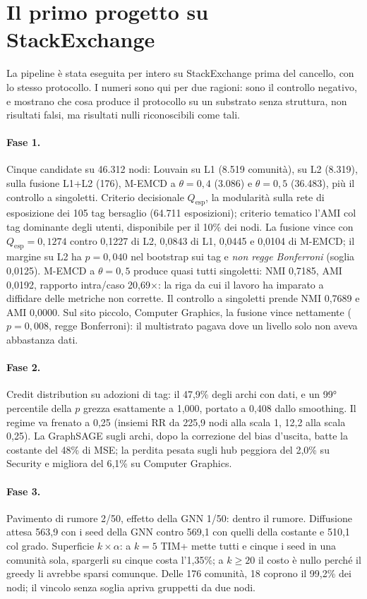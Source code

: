 \documentclass[11pt,a4paper]{article}
\newcommand{\Qesp}{Q_{\mathrm{esp}}}
\newcommand{\sx}{StackExchange}
\begin{document}
\clearpage
\section{Il primo progetto su StackExchange}
\label{app:stackexchange}
La pipeline è stata eseguita per intero su \sx{} prima del cancello, con lo stesso protocollo. I numeri sono qui per due ragioni: sono il controllo negativo, e mostrano che cosa produce il protocollo su un substrato senza struttura, non risultati falsi, ma risultati nulli riconoscibili come tali.

\paragraph{Fase 1.} Cinque candidate su 46.312 nodi: Louvain su L1 (8.519 comunità), su L2 (8.319), sulla fusione L1+L2 (176), M-EMCD a $\theta = 0{,}4$ (3.086) e $\theta = 0{,}5$ (36.483), più il controllo a singoletti. Criterio decisionale $\Qesp$, la modularità sulla rete di esposizione dei 105 tag bersaglio (64.711 esposizioni); criterio tematico l'AMI col tag dominante degli utenti, disponibile per il 10\% dei nodi. La fusione vince con $\Qesp = 0{,}1274$ contro 0,1227 di L2, 0,0843 di L1, 0,0445 e 0,0104 di M-EMCD; il margine su L2 ha $p = 0{,}040$ nel bootstrap sui tag e \emph{non regge Bonferroni} (soglia 0,0125). M-EMCD a $\theta = 0{,}5$ produce quasi tutti singoletti: NMI 0,7185, AMI 0,0192, rapporto intra/caso 20,69$\times$: la riga da cui il lavoro ha imparato a diffidare delle metriche non corrette. Il controllo a singoletti prende NMI 0,7689 e AMI 0,0000. Sul sito piccolo, Computer Graphics, la fusione vince nettamente ($p = 0{,}008$, regge Bonferroni): il multistrato pagava dove un livello solo non aveva abbastanza dati.

\paragraph{Fase 2.} Credit distribution su adozioni di tag: il 47,9\% degli archi con dati, e un 99° percentile della $p$ grezza esattamente a 1,000, portato a 0,408 dallo smoothing. Il regime va frenato a 0,25 (insiemi RR da 225,9 nodi alla scala 1, 12,2 alla scala 0,25). La GraphSAGE sugli archi, dopo la correzione del bias d'uscita, batte la costante del 48\% di MSE; la perdita pesata sugli hub peggiora del 2,0\% su Security e migliora del 6,1\% su Computer Graphics.

\paragraph{Fase 3.} Pavimento di rumore 2/50, effetto della GNN 1/50: dentro il rumore. Diffusione attesa 563,9 con i seed della GNN contro 569,1 con quelli della costante e 510,1 col grado. Superficie $k \times \alpha$: a $k = 5$ TIM+ mette tutti e cinque i seed in una comunità sola, spargerli su cinque costa l'1,35\%; a $k \ge 20$ il costo è nullo perché il greedy li avrebbe sparsi comunque. Delle 176 comunità, 18 coprono il 99,2\% dei nodi; il vincolo senza soglia apriva gruppetti da due nodi.
\end{document}
